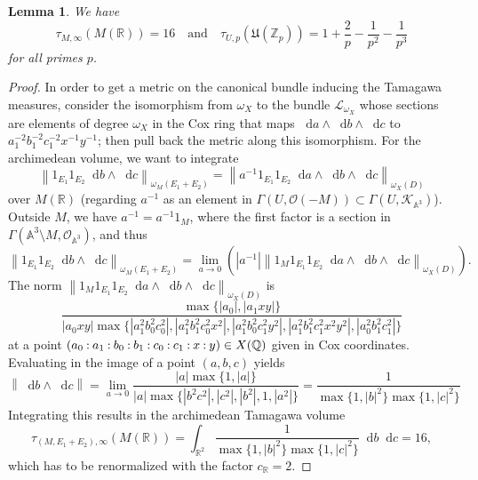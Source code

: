 \documentclass[a4paper, twoside, 10pt]{amsart}
\newcommand*\diff{\mathop{}\!\mathrm{d}}
\newcommand{\pc}[1]{%
  \begingroup\lccode`~=`: \lowercase{\endgroup
  \edef~}{\mathbin{\mathchar\the\mathcode`:}\nobreak}%
  (%
  \begingroup
  \mathcode`:=\string"8000
  #1%
  \endgroup
  )%
}
\newcommand{\cL}{\mathcal{L}}
\newcommand{\cO}{\mathcal{O}}
\newcommand{\mU}{\mathfrak{U}}
\newcommand{\bAA}{\mathbb{A}}
\newcommand{\RR}{\mathbb{R}}
\newcommand{\ZZ}{\mathbb{Z}}
\newcommand{\QQ}{\mathbb{Q}}
\newcommand{\abs}[1]{\left\lvert#1\right\rvert}
\newcommand{\norm}[1]{\left\lVert#1\right\rVert}
\newtheorem{lemma}[theorem]{Lemma}
\theoremstyle{definition}
\begin{document}
\begin{lemma}\label{lem:toric-volumes}
  We have
  \[
    \tau_{M,\infty}(M(\RR))=16
    \quad \text{and} \quad
    \tau_{U,p}(\mU(\ZZ_p))=1+\frac{2}{p}-\frac{1}{p^2}-\frac{1}{p^3}
  \]
  for all primes $p$.
\end{lemma}
\begin{proof}
  In order to get a metric on the canonical bundle inducing the Tamagawa measures, consider the isomorphism from $\omega_X$ to the bundle $\cL_{\omega_X}$ whose sections are elements of degree $\omega_X$ in the Cox ring that maps $\diff a \wedge \diff b \wedge \diff c$ to $a_1^{-2}b_1^{-2}c_1^{-2}x^{-1}y^{-1}$; then pull back the metric along this isomorphism.
  For the archimedean volume, we want to integrate
  \[
    \norm{1_{E_1} 1_{E_2} \diff b \wedge \diff c}_{\omega_M(E_1+E_2)}
    = \norm{a^{-1} 1_{E_1} 1_{E_2} \diff a \wedge \diff b \wedge \diff c}_{\omega_X(D)}
  \]
  over $M(\RR)$
  (regarding $a^{-1}$ as an element in $\Gamma(U,\cO(-M))\subset \Gamma(U,\mathcal{K}_{\bAA^3})$). Outside $M$, we have $a^{-1}=a^{-1} 1_{M}$, where the first factor is a section in $\Gamma(\bAA^3\setminus M,\cO_{\bAA^3})$, and thus
  \[
    \norm{1_{E_1} 1_{E_2} \diff b \wedge \diff c}_{\omega_M(E_1+E_2)}
    = \lim_{a\to 0} \left(
    \abs{a^{-1}}
    \norm{1_M 1_{E_1} 1_{E_2} \diff a \wedge \diff b \wedge \diff c}_{\omega_X(D)}\right).
  \]
  The norm $\norm{1_M 1_{E_1} 1_{E_2} \diff a \wedge \diff b \wedge \diff c}_{\omega_X(D)}$ is
  \[
    \frac{
      \max\{\abs{a_0},\abs{a_1xy}\}
    }{
      \abs{a_0xy}\max\{
        \abs{a_1^2b_0^2c_0^2},
        \abs{a_1^2b_1^2c_0^2x^2},
        \abs{a_1^2b_0^2c_1^2y^2},
        \abs{a_1^2b_1^2c_1^2x^2y^2},
        \abs{a_0^2b_1^2c_1^2}
      \}
    }
  \]
  at a point $\pc{a_0:a_1:b_0:b_1:c_0:c_1:x:y}\in X(\QQ)$ given in Cox coordinates. Evaluating in the image of a point $(a,b,c)$ yields
  \[
    \norm{\diff b \wedge \diff c}
    = \lim_{a\to 0}\frac{
      \abs{a}\max\{1,\abs{a}\}
    }{
      \abs{a}\max\{
      \abs{b^2c^2}, \abs{c^2}, \abs{b^2}, 1 , \abs{a^2}
    \}}
    = \frac{1}{\max\{1,\abs{b}^2\}\max\{1,\abs{c}^2\}}
  \]
  Integrating this results in the archimedean Tamagawa volume
  \[
    \tau_{(M,E_1+E_2),\infty} (M(\RR)) =
    \int_{\RR^2} \frac{1}{\max\{1,\abs{b}^2\}\max\{1,\abs{c}^2\}} \diff b \diff c = 16,
  \]
  which has to be renormalized with the factor $c_\RR=2$.


\end{proof}
\end{document}
